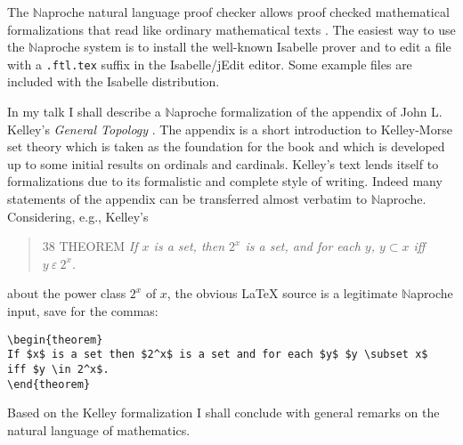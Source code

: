 \documentclass[bsl,meeting]{asl}
\newcommand{\NP}{}
\begin{document}
\thispagestyle{empty}


\NP  
{}


The $\mathbb{N}$aproche natural language proof checker allows proof checked
mathematical formalizations that read like ordinary mathematical texts
\cite{Naproche1, Naproche}. The easiest way to use the $\mathbb{N}$aproche{} system 
is to install the
well-known Isabelle prover \cite{Isabelle2021-1} and to edit a file with a 
\verb+.ftl.tex+ 
suffix in the Isabelle/jEdit editor. Some example files are included with the
Isabelle distribution.

In my talk I shall describe a $\mathbb{N}$aproche formalization of the appendix of John L. Kelley's \textit{General Topology} \cite{Kelley}. The appendix is a short introduction
to Kelley-Morse set theory which is taken as the foundation for the book and 
which is developed up to some initial results on ordinals and cardinals.
Kelley's text lends itself to formalizations due to its formalistic 
and complete style of writing. Indeed many statements of the appendix can be
transferred almost verbatim to $\mathbb{N}$aproche. Considering, e.g., Kelley's
\begin{quotation}
38 THEOREM {\it If $x$ is a set, then $2^x$ is a set, and for each $y$, $y \subset x$
iff $y \ \varepsilon \  2^x$.}
\end{quotation}
about the power class $2^x$ of $x$, the obvious \LaTeX{} source is a legitimate 
$\mathbb{N}$aproche input, save for the 
commas:
\begin{verbatim}
\begin{theorem}
If $x$ is a set then $2^x$ is a set and for each $y$ $y \subset x$ 
iff $y \in 2^x$.
\end{theorem}
\end{verbatim}

Based on the Kelley formalization I shall conclude with general remarks on the
natural language of mathematics.
\end{document}
